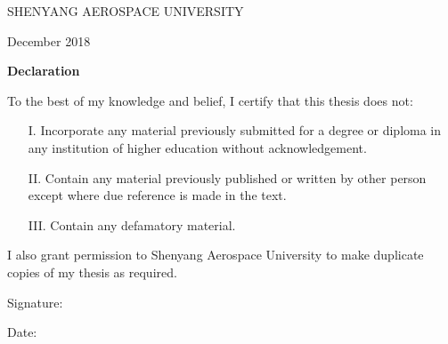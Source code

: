 \documentclass[12pt,a4paper]{article}
\newcommand\fillin[1][3cm]{\makebox[#1]{\dotfill}}
\renewcommand{\baselinestretch}{1.4}
\begin{document}
\begin{titlepage}
\begin{table}[ht]
\begin{tabular}{M{4cm}M{8cm}N}
	\end{tabular}
	\end{table}	
	\vspace*{\fill}
	\newpage
	\begin{center}
	
	{\fontsize{18}{5}\selectfont \begin{center}
	\vspace*{\fill}
	\MakeUppercase{Shenyang Aerospace University}
	\end{center} \par}
	\vspace{0.5cm}

	{\fontsize{16}{5}\selectfont \begin{center}
	December 2018
	\end{center}\par}
	\vspace{0.3cm}
	{\fontsize{16}{5}\selectfont \begin{center}
	\textbf{Declaration}
	\end{center}\par}
	\vspace{0.5cm} 
	\renewcommand{\baselinestretch}{1.5}
\RaggedRight \fontsize{14}{15}\selectfont To the best of my knowledge and belief, I certify that this thesis does not:\\
\begin{itemize}
	\item[I.] Incorporate any material previously submitted for a degree or diploma in any institution of higher education without acknowledgement.
	\item[II.] Contain any material previously published or written by other person except where due reference is made in the text.
	\item[III.] Contain any defamatory material.
\end{itemize}
I also grant permission to Shenyang Aerospace University to make duplicate copies of my thesis as required.	\\
\thispagestyle{empty}
\vspace*{3cm}	
\begin{flushleft}
Signature:\fillin[4.35cm]
\end{flushleft}
Date:\fillin[5.3cm]
	\end{center}
\vspace*{\fill}	
\end{titlepage}	
\end{document}

